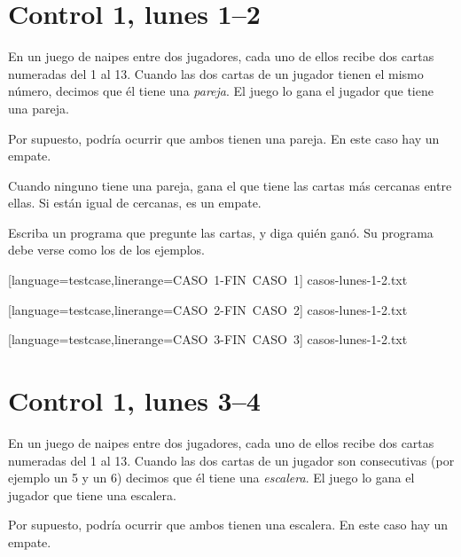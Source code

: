 \documentclass[12pt,spanish,a5paper,landscape]{article}
\begin{document}
  \pagestyle{empty}
  \thispagestyle{empty}

  \part*{Control 1, lunes 1--2}
  \newpage

  En un juego de naipes entre dos jugadores,
  cada uno de ellos recibe dos cartas numeradas del 1 al 13.
  Cuando las dos cartas de un jugador tienen el mismo número,
  decimos que él tiene una \emph{pareja}.
  El juego lo gana el jugador que tiene una pareja.

  Por supuesto,
  podría ocurrir que ambos tienen una pareja.
  En este caso hay un empate.

  Cuando ninguno tiene una pareja,
  gana el que tiene las cartas más cercanas entre ellas.
  Si están igual de cercanas, es un empate.

  Escriba un programa que pregunte las cartas,
  y diga quién ganó.
  Su programa debe verse como los de los ejemplos.

  \begin{minipage}{0.25\textwidth}
      [language=testcase,linerange=CASO\ 1-FIN\ CASO\ 1]%
      {casos-lunes-1-2.txt}
  \end{minipage}
  \hspace{1em}
  \begin{minipage}{0.25\textwidth}
      [language=testcase,linerange=CASO\ 2-FIN\ CASO\ 2]%
      {casos-lunes-1-2.txt}
  \end{minipage}
  \hspace{1em}
  \begin{minipage}{0.25\textwidth}
      [language=testcase,linerange=CASO\ 3-FIN\ CASO\ 3]%
      {casos-lunes-1-2.txt}
  \end{minipage}

  \newpage
  \part*{Control 1, lunes 3--4}
  \newpage

  En un juego de naipes entre dos jugadores,
  cada uno de ellos recibe dos cartas numeradas del 1 al 13.
  Cuando las dos cartas de un jugador son consecutivas
  (por ejemplo un 5 y un 6)
  decimos que él tiene una \emph{escalera}.
  El juego lo gana el jugador que tiene una escalera.

  Por supuesto,
  podría ocurrir que ambos tienen una escalera.
  En este caso hay un empate.
\end{document}
